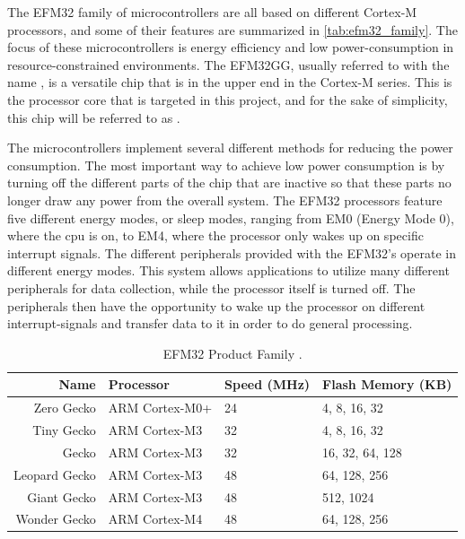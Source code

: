 The EFM32 family of microcontrollers are all based on different Cortex-M processors, and some of their features are summarized in \autoref{tab:efm32_family}.
The focus of these microcontrollers is energy efficiency and low power-consumption in resource-constrained environments.
The EFM32GG, usually referred to with the name , is a versatile chip that is in the upper end in the Cortex-M series.
This is the processor core that is targeted in this project, and for the sake of simplicity, this chip will be referred to as {\gecko}.

The microcontrollers implement several different methods for reducing the power consumption.
The most important way to achieve low power consumption is by turning off the different parts of the chip that are inactive so that these parts no longer draw any power from the overall system.
The EFM32 processors feature five different energy modes, or sleep modes, ranging from EM0 (Energy Mode 0), where the \gls{cpu} is on, to EM4, where the processor only wakes up on specific interrupt signals.
The different peripherals provided with the EFM32's operate in different energy modes.
This system allows applications to utilize many different peripherals for data collection, while the processor itself is turned off.
The peripherals then have the opportunity to wake up the processor on different interrupt-signals and transfer data to it in order to do general processing.

\begin{table}[b]
\begin{center}
    \begin{tabular}{r|l|l|l}
    \textbf{Name} & \textbf{Processor} & \textbf{Speed (MHz)} & \textbf{Flash Memory (KB)} \\
    \hline
    Zero Gecko    & ARM Cortex-M0+ & 24 & 4, 8, 16, 32    \\
    Tiny Gecko    & ARM Cortex-M3  & 32 & 4, 8, 16, 32    \\
    Gecko         & ARM Cortex-M3  & 32 & 16, 32, 64, 128 \\
    Leopard Gecko & ARM Cortex-M3  & 48 & 64, 128, 256    \\
    Giant Gecko   & ARM Cortex-M3  & 48 & 512, 1024       \\
    Wonder Gecko  & ARM Cortex-M4  & 48 & 64, 128, 256    \\
    \hline
    \end{tabular}
\end{center}
\caption{EFM32 Product Family \cite{Labs2014}.}
\label{tab:efm32_family}
\end{table}

